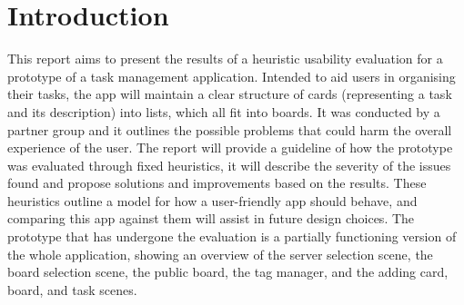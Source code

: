 \section{Introduction}

This report aims to present the results of a heuristic usability evaluation for a prototype of a task management application. Intended to aid users in organising their tasks, the app will maintain a clear structure of cards (representing a task and its description) into lists, which all fit into boards. It was conducted by a partner group and it outlines the possible problems that could harm the overall experience of the user. The report will provide a guideline of how the prototype was evaluated through fixed heuristics, it will describe the severity of the issues found and propose solutions and improvements based on the results. These heuristics outline a model for how a user-friendly app should behave, and comparing this app against them will assist in future design choices. The prototype that has undergone the evaluation is a partially functioning version of the whole application, showing an overview of the server selection scene, the board selection scene, the public board, the tag manager, and the adding card, board, and task scenes.